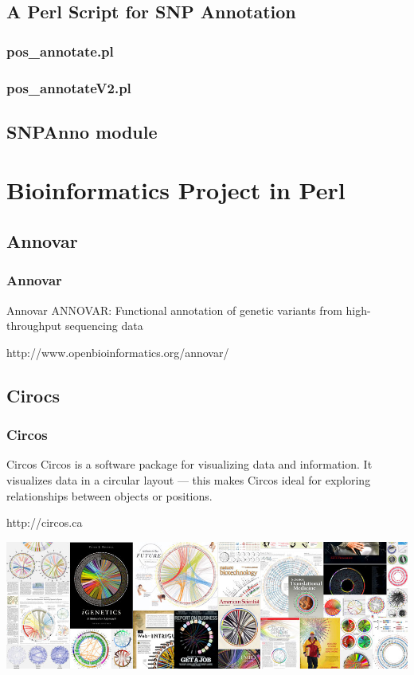 \documentclass[UTF8]{beamer}
\begin{document}
\subsection{A Perl Script for SNP Annotation}
\begin{frame}
  \frametitle{pos_annotate.pl}
\end{frame}

\begin{frame}
  \frametitle{pos_annotateV2.pl}
\end{frame}

\subsection{SNPAnno module}

\section{Bioinformatics Project in Perl}
\subsection{Annovar}
\begin{frame}
  \frametitle{Annovar}
  \begin{block}{Annovar}
    ANNOVAR: Functional annotation of genetic variants from high-throughput
    sequencing data
  \end{block}
  \centerline{http://www.openbioinformatics.org/annovar/}
\end{frame}

\subsection{Cirocs}
\begin{frame}
  \frametitle{Circos}
  \begin{block}{Circos}
    Circos is a software package for visualizing data and information. It
    visualizes data in a circular layout — this makes Circos ideal for
    exploring relationships between objects or positions.
  \end{block}
  \centerline{http://circos.ca}
\end{frame}

\begin{frame}
  \includegraphics[width=\textwidth]{circos.jpg}
\end{frame}
\end{document}
